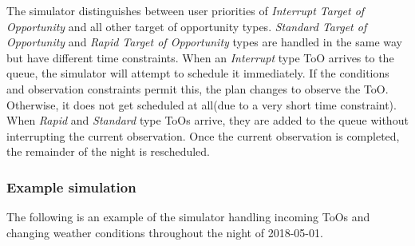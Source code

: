 \documentclass{article}
\begin{document}
The simulator distinguishes between user priorities of \textit{Interrupt Target of Opportunity} and all other target of opportunity types.  \textit{Standard Target of Opportunity} and \textit{Rapid Target of Opportunity} types are handled in the same way but have different time constraints.  When an \textit{Interrupt} type ToO arrives to the queue, the simulator will attempt to schedule it immediately.  If the conditions and observation constraints permit this, the plan changes to observe the ToO.  Otherwise, it does not get scheduled at all(due to a very short time constraint).  When \textit{Rapid} and \textit{Standard} type ToOs arrive, they are added to the queue without interrupting the current observation.  Once the current observation is completed, the remainder of the night is rescheduled.  

\subsubsection{Example simulation}
\label{sec:examplesim}
The following is an example of the simulator handling incoming ToOs and changing weather conditions throughout the night of 2018-05-01.
\end{document}
